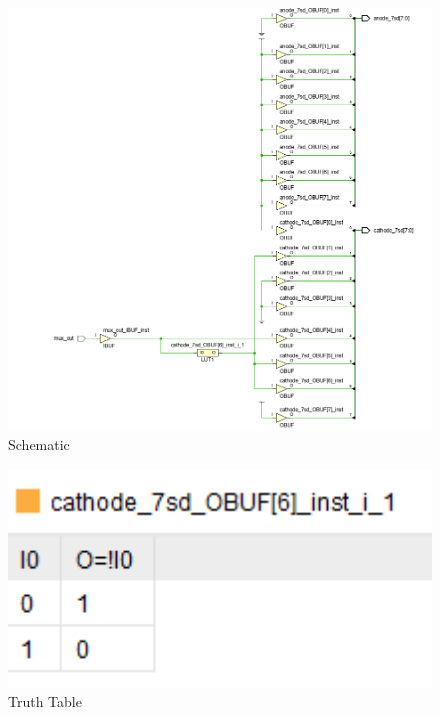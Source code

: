 \documentclass{article}
\begin{document}
\begin{figure}[h]
\begin{center}
\includegraphics[width=1\textwidth]{DisplaySchematic.png} %
\caption{Schematic}
\end{center}
\end{figure}


\begin{figure}[h]
\begin{center}
\includegraphics[width=1\textwidth]{DisplayTruthTable.png} %
\caption{Truth Table}
\end{center}
\end{figure}
\end{document}
